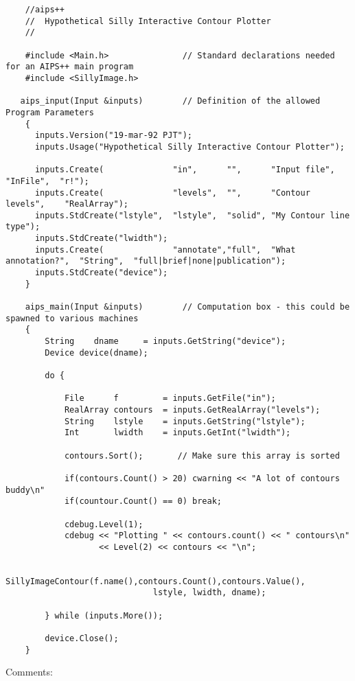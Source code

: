 \footnotesize\begin{verbatim}
    //aips++
    //  Hypothetical Silly Interactive Contour Plotter 
    // 
    
    #include <Main.h>       		// Standard declarations needed for an AIPS++ main program
    #include <SillyImage.h>

   aips_input(Input &inputs)		// Definition of the allowed Program Parameters
    {
      inputs.Version("19-mar-92 PJT");
      inputs.Usage("Hypothetical Silly Interactive Contour Plotter");

      inputs.Create(              "in",      "",      "Input file",        "InFile",  "r!");
      inputs.Create(              "levels",  "",      "Contour levels",    "RealArray");
      inputs.StdCreate("lstyle",  "lstyle",  "solid", "My Contour line type");
      inputs.StdCreate("lwidth");
      inputs.Create(              "annotate","full",  "What annotation?",  "String",  "full|brief|none|publication");
      inputs.StdCreate("device");
    }

    aips_main(Input &inputs)		// Computation box - this could be spawned to various machines
    {
        String    dname     = inputs.GetString("device");
        Device device(dname);

        do {

            File      f         = inputs.GetFile("in");
            RealArray contours  = inputs.GetRealArray("levels");
            String    lstyle    = inputs.GetString("lstyle");
            Int       lwidth    = inputs.GetInt("lwidth");

            contours.Sort();       // Make sure this array is sorted

            if(contours.Count() > 20) cwarning << "A lot of contours buddy\n"
            if(countour.Count() == 0) break;
                
            cdebug.Level(1);
            cdebug << "Plotting " << contours.count() << " contours\n"
                   << Level(2) << contours << "\n";
 
            SillyImageContour(f.name(),contours.Count(),contours.Value(),
                              lstyle, lwidth, dname);

        } while (inputs.More());

        device.Close();
    }
\end{verbatim}\normalsize

\newpage
Comments:

